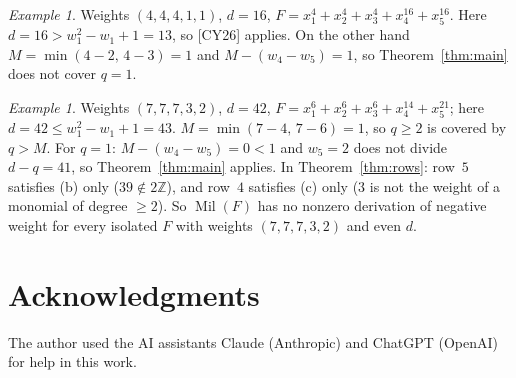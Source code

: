 \documentclass[11pt]{article}
\newcommand{\Mil}{\operatorname{Mil}(F)}
\theoremstyle{remark}
\newtheorem{example}[theorem]{Example}
\begin{document}
\begin{example}\label{ex:3331}
Weights $(4,4,4,1,1)$, $d=16$, $F=x_1^4+x_2^4+x_3^4+x_4^{16}+x_5^{16}$. Here $d=16>w_1^2-w_1+1=13$, so [CY26] applies. On the other hand $M=\min(4-2,\,4-3)=1$ and $M-(w_4-w_5)=1$, so Theorem~\ref{thm:main} does not cover $q=1$.
\end{example}

\begin{example}\label{ex:77732}
Weights $(7,7,7,3,2)$, $d=42$, $F=x_1^6+x_2^6+x_3^6+x_4^{14}+x_5^{21}$; here $d=42\le w_1^2-w_1+1=43$. $M=\min(7-4,\,7-6)=1$, so $q\ge2$ is covered by $q>M$. For $q=1$: $M-(w_4-w_5)=0<1$ and $w_5=2$ does not divide $d-q=41$, so Theorem~\ref{thm:main} applies. In Theorem~\ref{thm:rows}: row~$5$ satisfies (b) only ($39\notin2\mathbb Z$), and row~$4$ satisfies (c) only ($3$ is not the weight of a monomial of degree $\ge2$). So $\Mil$ has no nonzero derivation of negative weight for every isolated $F$ with weights $(7,7,7,3,2)$ and even $d$.
\end{example}

\section*{Acknowledgments}
The author used the AI assistants Claude (Anthropic) and ChatGPT (OpenAI) for help in this work.
\end{document}
